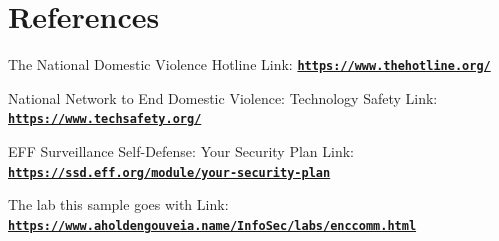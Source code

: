 \documentclass[11pt]{article}
\begin{document}
\section{References}
The National Domestic Violence Hotline
Link: \href{https://www.thehotline.org/}{\textbf{\nolinkurl{https://www.thehotline.org/}}}

National Network to End Domestic Violence: Technology Safety
Link: \href{https://www.techsafety.org/}{\textbf{\nolinkurl{https://www.techsafety.org/}}}

EFF Surveillance Self-Defense: Your Security Plan
Link: \href{https://ssd.eff.org/module/your-security-plan}{\textbf{\nolinkurl{https://ssd.eff.org/module/your-security-plan}}}

The lab this sample goes with
Link: \href{https://www.aholdengouveia.name/InfoSec/labs/enccomm.html}{\textbf{\nolinkurl{https://www.aholdengouveia.name/InfoSec/labs/enccomm.html}}}
\end{document}
